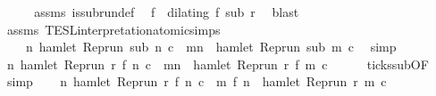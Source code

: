 \begin{isabellebody}
\endisadelimproof
%
\isatagproof
{}\isamarkupfalse%
\ {\isacharminus}\isanewline
\ \ \isamarkupfalse%
\ assms{\isacharparenleft}{}{\isacharparenright}\ is{\isacharunderscore}subrun{\isacharunderscore}def\ \isamarkupfalse%
\ f\ \ {\isacharasterisk}{\isacharcolon}{\isacartoucheopen}dilating\ f\ sub\ r{\isacartoucheclose}\ \isamarkupfalse%
\ blast\isanewline
\ \ \isamarkupfalse%
\ assms{\isacharparenleft}{}{\isacharparenright}\ TESL{\isacharunderscore}interpretation{\isacharunderscore}atomic{\isachardot}simps{\isacharparenleft}{}{\isacharparenright}\ \isamarkupfalse%
\isanewline
\ \ \ \ {\isacartoucheopen}{\isasymforall}n{\isachardot}\ hamlet\ {\isacharparenleft}Rep{\isacharunderscore}run\ sub\ n\ c\ {\isasymlongrightarrow}\ {\isacharparenleft}{\isasymforall}m{\isasymge}n{\isachardot}\ {\isasymnot}\ hamlet\ {\isacharparenleft}Rep{\isacharunderscore}run\ sub\ m\ c\ \isamarkupfalse%
\ simp\isanewline
\ \ \isamarkupfalse%
\ {}{\isacharcolon}{\isacartoucheopen}{\isasymforall}n{\isachardot}\ hamlet\ {\isacharparenleft}Rep{\isacharunderscore}run\ r\ {\isacharparenleft}f\ n{\isacharparenright}\ c\ {\isasymlongrightarrow}\ {\isacharparenleft}{\isasymforall}m{\isasymge}n{\isachardot}\ {\isasymnot}\ hamlet\ {\isacharparenleft}Rep{\isacharunderscore}run\ r\ {\isacharparenleft}f\ m{\isacharparenright}\ c\isanewline
\ \ \ \ \isamarkupfalse%
\ ticks{\isacharunderscore}sub{\isacharbrackleft}OF\ {\isacharasterisk}{\isacharbrackright}\ \isamarkupfalse%
\ simp\isanewline
\ \ \isamarkupfalse%
\ {\isacartoucheopen}{\isasymforall}n{\isachardot}\ hamlet\ {\isacharparenleft}Rep{\isacharunderscore}run\ r\ {\isacharparenleft}f\ n{\isacharparenright}\ c\ {\isasymlongrightarrow}\ {\isacharparenleft}{\isasymforall}m{\isasymge}\ {\isacharparenleft}f\ n{\isacharparenright}{\isachardot}\ {\isasymnot}\ hamlet\ {\isacharparenleft}Rep{\isacharunderscore}run\ r\ m\ c\isanewline
\ \ \isamarkupfalse%
\ {\isacharminus}\isanewline
\ \ \ \ \isacommand{{\isacharbraceleft}}\isamarkupfalse%

\end{isabellebody}
